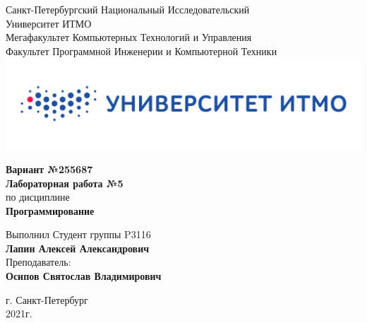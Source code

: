 \documentclass[12pt,onecolumn]{article}
\begin{document}
\setcounter{tocdepth}{4}
\begin{center}
    Санкт-Петербургский Национальный Исследовательский\\ 
    Университет ИТМО\\
    Мегафакультет Компьютерных Технологий и Управления\\
    Факультет Программной Инженерии и Компьютерной Техники \\
    \includegraphics[scale=0.3]{itm.jpg} %
\end{center}
\vspace{1cm}


\begin{center}
    \large \textbf{Вариант №255687}\\
    \textbf{Лабораторная работа №5}\\
    по дисциплине\\
    \textbf{Программирование}
\end{center}

\vspace{2cm}

\begin{flushright}
  Выполнил Студент  группы P3116\\
  \textbf{Лапин Алексей Александрович}\\
  Преподаватель: \\
  \textbf{Осипов Святослав Владимирович}\\
\end{flushright}

\vspace{10cm}
\begin{center}
    г. Санкт-Петербург\\
    2021г.
\end{center}
\newpage
\tableofcontents
\newpage
\end{document}
